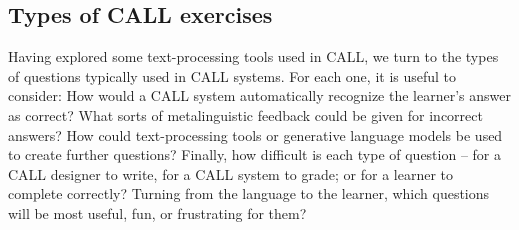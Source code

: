 



\subsection{Types of CALL exercises}

Having explored some text-processing tools used in CALL, we turn to the types of questions typically used in CALL systems.  For each one, it is useful to consider: How would a CALL system automatically recognize the learner's answer as correct?  What sorts of metalinguistic feedback could be given for incorrect answers?  How could text-processing tools or generative language models be used to create further questions?  Finally, how difficult is each type of question -- for a CALL designer to write, for a CALL system to grade; or for a learner to complete correctly?  Turning from the language to the learner, which questions will be most useful, fun, or frustrating for them?


